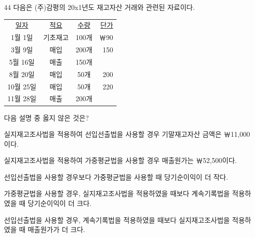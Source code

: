 \begin{question}{44}
다음은 (주)감평의 20x1년도 재고자산 거래와 관련된 자료이다.
\begin{framedtext}
\centering
\begin{tabular}{cccr}
\uline{일자} & \uline{적요} & \uline{수량} & \uline{단가} \\
1월 1일 & 기초재고 & 100개 & ￦90 \\
3월 9일 & 매입 & 200개 & 150 \\
5월 16일 & 매출 & 150개 & \\
8월 20일 & 매입 & 50개 & 200 \\
10월 25일 & 매입 & 50개 & 220 \\
11월 28일 & 매출 & 200개 & \\
\end{tabular}
\end{framedtext}
다음 설명 중 옳지 않은 것은? \par
\begin{choices}
  \item 실지재고조사법을 적용하여 선입선출법을 사용할 경우 기말재고자산 금액은 ￦11,000이다.
  \item 실지재고조사법을 적용하여 가중평균법을 사용할 경우 매출원가는 ￦52,500이다.
  \item 선입선출법을 사용할 경우보다 가중평균법을 사용할 때 당기순이익이 더 작다.
  \item 가중평균법을 사용할 경우, 실지재고조사법을 적용하였을 때보다 계속기록법을 적용하였을 때 당기순이익이 더 크다.
  \item 선입선출법을 사용할 경우, 계속기록법을 적용하였을 때보다 실지재고조사법을 적용하였을 때 매출원가가 더 크다.
\end{choices}
\end{question}
